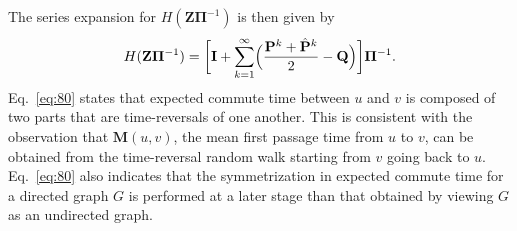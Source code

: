 The series expansion for $H(\mathbf{Z}\bm{\Pi}^{-1})$ is then given by
\begin{equation}
  \label{eq:80}
  H(\mathbf{Z}\bm{\Pi}^{-1})= \biggl[ \mathbf{I} +
  \sum_{k=1}^{\infty}\Bigl(\frac{\mathbf{P}^{k} + \hat{\mathbf{P}}^{k}}{2}
  - \mathbf{Q}\Bigr)\biggr] \bm{\Pi}^{-1}.
\end{equation}
Eq.~\eqref{eq:80} states that expected commute time between $u$ and
$v$ is composed of two parts that are time-reversals of one
another. This is consistent with the observation that
$\mathbf{M}(u,v)$, the mean first passage time from $u$ to $v$, can be
obtained from the time-reversal random walk starting from $v$ going
back to $u$. Eq.~\eqref{eq:80} also indicates that the symmetrization
in expected commute time for a directed graph $G$ is performed at a
later stage than that obtained by viewing $G$ as an undirected graph.
